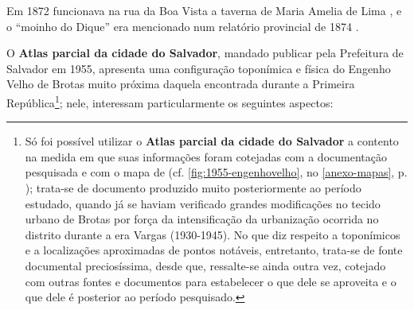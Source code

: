 Em 1872 funcionava na rua da Boa Vista a taverna de Maria Amelia de Lima \cite[terceira~parte, pp.~48]{pimenta_almanak_1872}, e o ``moinho do Dique'' era mencionado num relatório provincial de 1874 \cite[p.~26]{bahia_rpe_1874b}. 

O \textbf{Atlas parcial da cidade do Salvador}, mandado publicar pela Prefeitura de Salvador em 1955, apresenta uma configuração toponímica e física do Engenho Velho de Brotas muito próxima daquela encontrada durante a Primeira República\footnote{Só foi possível utilizar o \textbf{Atlas parcial da cidade do Salvador} a contento na medida em que suas informações foram cotejadas com a documentação pesquisada e com o mapa de  (cf. \autoref{fig:1955-engenhovelho}, no \autoref{anexo-mapas}, p. \pageref{fig:1955-engenhovelho}); trata-se de documento produzido muito posteriormente ao período estudado, quando já se haviam verificado grandes modificações no tecido urbano de Brotas por força da intensificação da urbanização ocorrida no distrito durante a era Vargas (1930-1945). No que diz respeito a toponímicos e a localizações aproximadas de pontos notáveis, entretanto, trata-se de fonte documental preciosíssima, desde que, ressalte-se ainda outra vez, cotejado com outras fontes e documentos para estabelecer o que dele se aproveita e o que dele é posterior ao período pesquisado.}; nele, interessam particularmente os seguintes aspectos:

